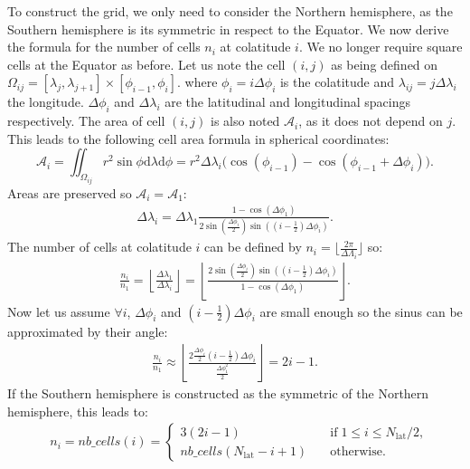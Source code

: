 To construct the grid, we only need to consider the Northern hemisphere, as the
Southern hemisphere is its symmetric in respect to the Equator.  We now derive
the formula for the number of cells $n_i$ at colatitude $i$. We no longer
require square cells at the Equator as before. Let us note the cell $(i,j)$ as
being defined on 
$\Omega_{ij} = [\lambda_j, \lambda_{j+1}]\times [\phi_{i-1},\phi_i]$. 
where $\phi_i=i\Delta\phi_i$ is the colatitude and
$\lambda_{ij}=j\Delta\lambda_i$ the longitude.
$\Delta\phi_i$ and $\Delta\lambda_i$ are the latitudinal and
longitudinal spacings respectively.
The area of cell $(i,j)$ is also noted $\mathcal{A}_{i}$, as it does not
depend on $j$. This leads to the following cell area formula in spherical
coordinates:
\begin{equation}
  \mathcal{A}_{i} = \iint_{\Omega_{ij}}  r^2 \sin\phi 
  \mathrm{d}\lambda \mathrm{d}\phi \nonumber
  = r^2 \Delta\lambda_i \big (\cos(\phi_{i-1}) - \cos(\phi_{i-1}+\Delta\phi_i)\big).
  \label{eqn:cell_area}
\end{equation}
Areas are preserved so $\mathcal{A}_i=\mathcal{A}_1$:
\begin{align*} \Delta\lambda_i  = \Delta\lambda_1 \frac {1-\cos(\Delta\phi_1)}
  {2\sin\left( \frac{\Delta\phi_i}{2} \right) \sin\left(\left(i-\frac{1}{2}\right)\Delta\phi_i\right)}.
\end{align*}
The number of cells at colatitude $i$ can be defined by
$n_i = \lfloor \frac{2\pi}{\Delta\Lambda_i}\rfloor$ so:
\begin{align*} \frac{n_i}{n_1} = \left\lfloor \frac{\Delta\lambda_1}{\Delta\lambda_i} \right\rfloor=
  \left\lfloor \frac {2\sin\left( \frac{\Delta\phi_i}{2} \right) \sin\left(\left(i-\frac{1}{2}\right)\Delta\phi_i\right)}%
  {1-\cos(\Delta\phi_1)}\right\rfloor.
\end{align*}
Now let us assume $\forall i$, $\Delta\phi_i$ and
$(i-\frac{1}{2})\Delta\phi_i$ are small enough so the sinus can be approximated
by their angle:
\begin{align*} \frac{n_i}{n_1} \approx
  \left\lfloor \frac{2  \frac{\Delta\phi_i}{2}  \left(i-\frac{1}{2}\right) \Delta\phi_i}%
  { \frac{\Delta\phi_1^2}{2}} \right\rfloor
  = 2i-1.
\end{align*}
If the Southern hemisphere is constructed as the symmetric of the Northern
hemisphere, this leads to:
\begin{align}
  &n_i = nb\_cells(i) =
  \begin{cases}
    3(2i-1) & \quad \text{if} \; 1 \le i \le N_{\text{lat}}/2, \\
    nb\_cells(N_\mathrm{lat}-i+1) & \quad \text{otherwise.}
  \end{cases}
  \label{eqn:nb_cells}
\end{align}
